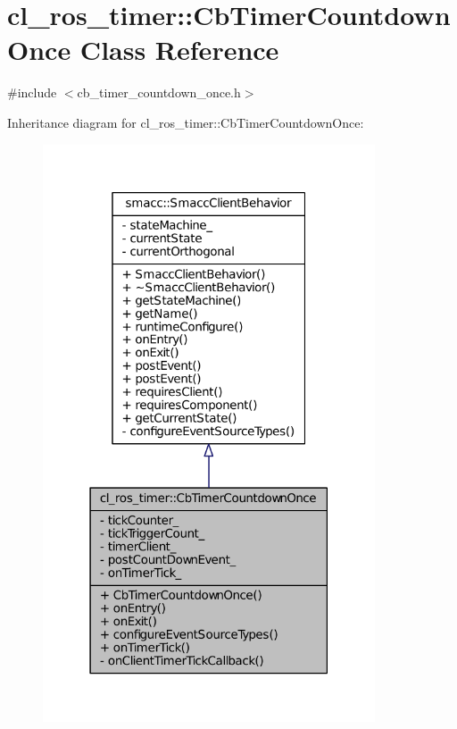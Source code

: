 \hypertarget{classcl__ros__timer_1_1CbTimerCountdownOnce}{}\section{cl\+\_\+ros\+\_\+timer\+:\+:Cb\+Timer\+Countdown\+Once Class Reference}
\label{classcl__ros__timer_1_1CbTimerCountdownOnce}


{\ttfamily \#include $<$cb\+\_\+timer\+\_\+countdown\+\_\+once.\+h$>$}



Inheritance diagram for cl\+\_\+ros\+\_\+timer\+:\+:Cb\+Timer\+Countdown\+Once\+:
\nopagebreak
\begin{figure}[H]
\begin{center}
\leavevmode
\includegraphics[width=279pt]{classcl__ros__timer_1_1CbTimerCountdownOnce__inherit__graph}
\end{center}
\end{figure}


